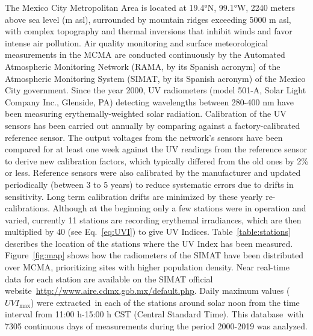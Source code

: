 \documentclass[journal=jacsat,manuscript=article]{achemso}
\begin{document}
The Mexico City Metropolitan Area is located at 19.4°N, 99.1°W, 2240
meters above sea level (m asl), surrounded by mountain ridges exceeding
5000 m asl, with complex topography and thermal inversions that inhibit
winds and favor intense air pollution.\citep{Whiteman_2000,Fast_2007,Carre_n_Sierra_2015}
Air quality
monitoring and surface meteorological measurements in the MCMA are
conducted continuously by the Automated Atmospheric Monitoring Network
(RAMA, by its Spanish acronym) of the Atmospheric Monitoring System
(SIMAT, by its Spanish acronym) of the Mexico City government. Since the
year 2000, UV radiometers (model 501-A, Solar Light Company Inc.,
Glenside, PA) detecting wavelengths between 280-400 nm have been
measuring erythemally-weighted solar radiation. Calibration of the
UV sensors has been carried out annually by comparing against a
factory-calibrated reference sensor. The output voltages from the
network’s sensors have been compared for at least one week against the UV
readings from the reference sensor to derive new calibration factors, which typically differed
from the old ones by 2\% or less.
Reference sensors were also calibrated by the manufacturer and updated
periodically (between 3 to 5 years) to reduce systematic errors due to drifts in sensitivity.
Long term calibration drifts are minimized by these yearly re-calibrations.
Although at the beginning only a few stations were in operation and
varied, currently 11 stations are recording erythemal
irradiances, which are then multiplied by 40 (see
Eq.~{\ref{eq:UVI}}) to give UV Indices.
Table~{\ref{table:stations}} describes the location of
the stations where the UV Index has been measured.
Figure~{\ref{fig:map}} shows how the radiometers of the
SIMAT have been distributed over MCMA, prioritizing sites with higher population density.
Near real-time data for each station are
available on the SIMAT official
website~\url{http://www.aire.cdmx.gob.mx/default.php}. Daily maximum
values (\(UVI_{\max}\)) were extracted~in each of the stations
around solar noon from the time interval from 11:00 h-15:00 h CST
(Central Standard Time). This database~with 7305 continuous days of
measurements during the period 2000-2019 was analyzed.
\end{document}

